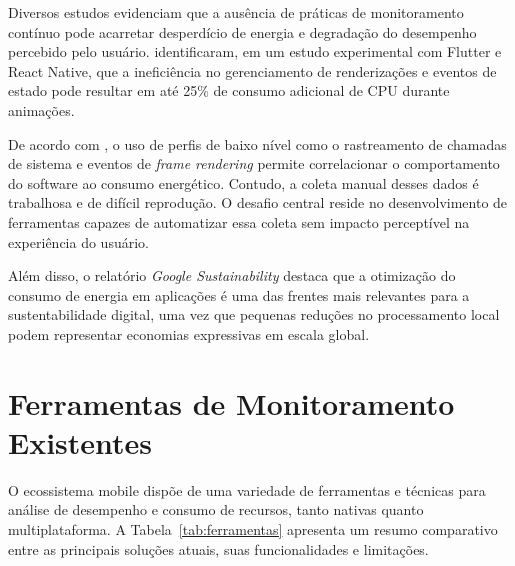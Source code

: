 \documentclass[12pt,a4paper,oneside]{abntex2}
\begin{document}
Diversos estudos evidenciam que a ausência de práticas de monitoramento contínuo pode acarretar desperdício de energia e degradação do desempenho percebido pelo usuário.  \cite{zhang2021energy} identificaram, em um estudo experimental com Flutter e React Native, que a ineficiência no gerenciamento de renderizações e eventos de estado pode resultar em até 25\% de consumo adicional de CPU durante animações.  

De acordo com  \cite{johnson2020monitoring}, o uso de perfis de baixo nível como o rastreamento de chamadas de sistema e eventos de \textit{frame rendering} permite correlacionar o comportamento do software ao consumo energético. Contudo, a coleta manual desses dados é trabalhosa e de difícil reprodução. O desafio central reside no desenvolvimento de ferramentas capazes de automatizar essa coleta sem impacto perceptível na experiência do usuário.  

Além disso, o relatório \textit{Google Sustainability} \cite{google2024sustainability} destaca que a otimização do consumo de energia em aplicações é uma das frentes mais relevantes para a sustentabilidade digital, uma vez que pequenas reduções no processamento local podem representar economias expressivas em escala global.


\section{Ferramentas de Monitoramento Existentes}
O ecossistema mobile dispõe de uma variedade de ferramentas e técnicas para análise de desempenho e consumo de recursos, tanto nativas quanto multiplataforma. A Tabela~\ref{tab:ferramentas} apresenta um resumo comparativo entre as principais soluções atuais, suas funcionalidades e limitações.
\end{document}
